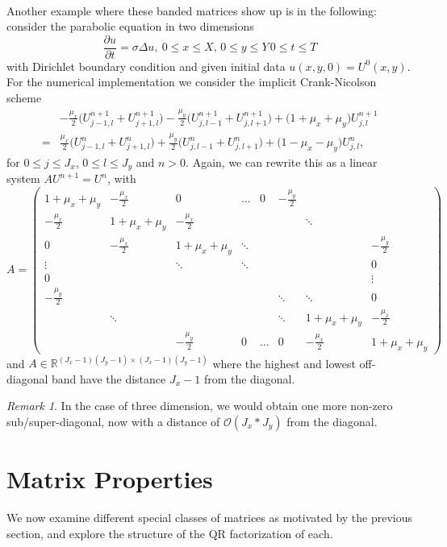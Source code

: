 \documentclass{article}
\numberwithin{pic}{section}
\numberwithin{lem}{section}
\numberwithin{thm}{section}
\numberwithin{cor}{section}
\theoremstyle{definition}
\numberwithin{ex}{section}
\numberwithin{defn}{section}
\theoremstyle{definition}
\theoremstyle{remark}
\newtheorem{rem}{Remark}
\newcommand{\R}{\ensuremath{\mathbb{R}}} %
\begin{document}
\paragraph{} Another example where these banded matrices show up is in the following:
consider the parabolic equation in two dimensions
\[\frac{\partial u}{\partial t}=\sigma \Delta u,~ 0\leq x\leq X,\, 0\leq y\leq Y\, 0\leq t\leq T\]
with Dirichlet boundary condition and given initial data $u(x,y,0)=U^0(x,y)$. For the numerical implementation we consider the implicit Crank-Nicolson scheme
\begin{align*}
&-\frac{\mu_x}{2}\big(U_{j-1,l}^{n+1}+ U_{j+1,l}^{n+1}\big) -\frac{\mu_y}{2}\big(U_{j,l-1}^{n+1}+U_{j,l+1}^{n+1}\big)+\big(1+\mu_x+\mu_y\big)U_{j,l}^{n+1}\\
=&\frac{\mu_x}{2}\big(U_{j-1,l}^{n}+ U_{j+1,l}^{n}\big) +\frac{\mu_y}{2}\big(U_{j,l-1}^{n}+U_{j,l+1}^{n}\big)+\big(1-\mu_x-\mu_y\big)U_{j,l}^{n},
\end{align*}
for $0\leq j\leq J_x$, $0\leq l\leq J_y$ and $n>0$.
Again, we can rewrite this as a linear system $AU^{n+1}=U^n$, with 
\[A=\begin{pmatrix}
1+\mu_x+\mu_y & -\frac{\mu_x}{2} & 0 & \dots & 0 & -\frac{\mu_y}{2} &  &  \\ 
-\frac{\mu_x}{2} & 1+\mu_x+\mu_y & -\frac{\mu_x}{2} &  &  &  & \ddots &  \\ 
0 & -\frac{\mu_x}{2} & 1+\mu_x+\mu_y & \ddots &  &  &  & -\frac{\mu_y}{2} \\ 
\vdots  &  & \ddots & \ddots &  &  &  & 0\\ 
0 &  &  &  &  &  &  & \vdots \\ 
-\frac{\mu_y}{2} &  &  &  &  & \ddots & \ddots & 0 \\ 
 & \ddots &  &  &  & \ddots & 1+\mu_x+\mu_y & -\frac{\mu_x}{2} \\ 
 &  & -\frac{\mu_y}{2} & 0 & \dots & 0 & -\frac{\mu_x}{2} & 1+\mu_x+\mu_y
\end{pmatrix} \]
and $A\in\R^{(J_x-1)(J_y-1)\times (J_x-1)(J_y-1)}$ where the highest and lowest off-diagonal band have the distance $J_x-1$ from the diagonal.
\begin{rem}
In the case of three dimension, we would obtain one more non-zero sub/super-diagonal, now with a distance of $\mathcal{O}(J_x*J_y)$ from the diagonal.
\end{rem}
\pagebreak
\section{Matrix Properties}
We now examine different special classes of matrices as motivated by the
previous section, and explore the structure of the QR factorization of each.
\end{document}
